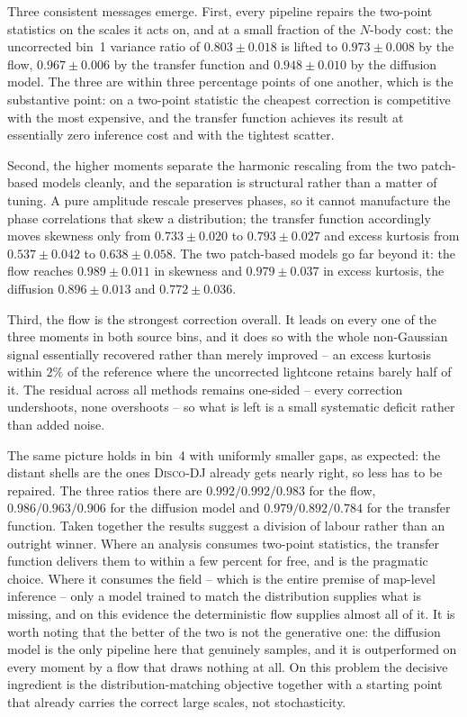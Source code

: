 \documentclass{report}
\begin{document}
Three consistent messages emerge. First, every pipeline repairs the two-point statistics on the scales it acts on, and at a small fraction of the \mbox{$N$}-body cost: the uncorrected bin~1 variance ratio of \mbox{$0.803 \pm 0.018$} is lifted to \mbox{$0.973 \pm 0.008$} by the flow, \mbox{$0.967 \pm 0.006$} by the transfer function and \mbox{$0.948 \pm 0.010$} by the diffusion model. The three are within three percentage points of one another, which is the substantive point: on a two-point statistic the cheapest correction is competitive with the most expensive, and the transfer function achieves its result at essentially zero inference cost and with the tightest scatter.

Second, the higher moments separate the harmonic rescaling from the two patch-based models cleanly, and the separation is structural rather than a matter of tuning. A pure amplitude rescale preserves phases, so it cannot manufacture the phase correlations that skew a distribution; the transfer function accordingly moves skewness only from \mbox{$0.733 \pm 0.020$} to \mbox{$0.793 \pm 0.027$} and excess kurtosis from \mbox{$0.537 \pm 0.042$} to \mbox{$0.638 \pm 0.058$}. The two patch-based models go far beyond it: the flow reaches \mbox{$0.989 \pm 0.011$} in skewness and \mbox{$0.979 \pm 0.037$} in excess kurtosis, the diffusion \mbox{$0.896 \pm 0.013$} and \mbox{$0.772 \pm 0.036$}.

Third, the flow is the strongest correction overall. It leads on every one of the three moments in both source bins, and it does so with the whole non-Gaussian signal essentially recovered rather than merely improved -- an excess kurtosis within \mbox{$2\%$} of the reference where the uncorrected lightcone retains barely half of it. The residual across all methods remains one-sided -- every correction undershoots, none overshoots -- so what is left is a small systematic deficit rather than added noise.

The same picture holds in bin~4 with uniformly smaller gaps, as expected: the distant shells are the ones \textsc{Disco-DJ} already gets nearly right, so less has to be repaired. The three ratios there are \mbox{$0.992/0.992/0.983$} for the flow, \mbox{$0.986/0.963/0.906$} for the diffusion model and \mbox{$0.979/0.892/0.784$} for the transfer function. Taken together the results suggest a division of labour rather than an outright winner. Where an analysis consumes two-point statistics, the transfer function delivers them to within a few percent for free, and is the pragmatic choice. Where it consumes the field -- which is the entire premise of map-level inference -- only a model trained to match the distribution supplies what is missing, and on this evidence the deterministic flow supplies almost all of it. It is worth noting that the better of the two is not the generative one: the diffusion model is the only pipeline here that genuinely samples, and it is outperformed on every moment by a flow that draws nothing at all. On this problem the decisive ingredient is the distribution-matching objective together with a starting point that already carries the correct large scales, not stochasticity.
\end{document}

